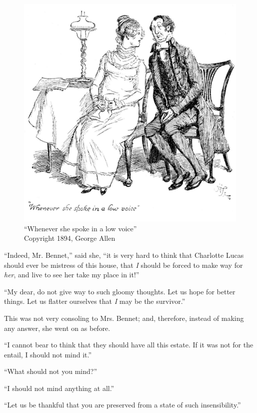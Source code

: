 \begin{figure}[htbp]
    \centering
    \includegraphics[width=\textwidth]{illustrations/i_195.jpg}
    \caption{“Whenever she spoke in a low voice”\\ Copyright 1894, George Allen}
    \label{fig:image}
\end{figure}

``Indeed, Mr. Bennet,'' said she, ``it is very hard to think that Charlotte Lucas should ever be mistress of this house, that \textit{I} should be forced to make way for \textit{her}, and live to see her take my place in it!''

``My dear, do not give way to such gloomy thoughts. Let us hope for better things. Let us flatter ourselves that \textit{I} may be the survivor.''

This was not very consoling to Mrs. Bennet; and, therefore, instead of making any answer, she went on as before.

``I cannot bear to think that they should have all this estate. If it was not for the entail, I should not mind it.''

``What should not you mind?''

``I should not mind anything at all.''

``Let us be thankful that you are preserved from a state of such insensibility.''

